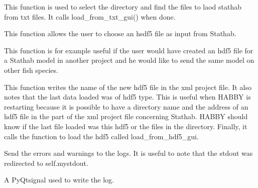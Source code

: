\documentclass[letterpaper,10pt,english]{sphinxmanual}
\begin{document}
\begin{fulllineitems}

\begin{fulllineitems}
\label{\detokenize{index:src_GUI.stathab_GUI.StathabW.select_dir}}
This function is used to select the directory and find the files to laod stathab from txt files. It calls
load\_from\_txt\_gui() when done.

\end{fulllineitems}


\begin{fulllineitems}
\label{\detokenize{index:src_GUI.stathab_GUI.StathabW.select_hdf5}}
This function allows the user to choose an hsdf5 file as input from Stathab.


This function is for example useful if the user would have created an hdf5 file for a Stathab model in another
project and he would like to send the same model on other fish species.

This function writes the name of the new hdf5 file in the xml project file. It also notes that the last data
loaded was of hdf5 type. This is useful when HABBY is restarting because it is possible to have a
directory name and the address of an hdf5 file in the part of the xml project file concerning Stathab.
HABBY should know if the last file loaded was this hdf5 or the files in the directory.
Finally, it calls the function to load the hdf5 called load\_from\_hdf5\_gui.

\end{fulllineitems}


\begin{fulllineitems}
\label{\detokenize{index:src_GUI.stathab_GUI.StathabW.send_err_log}}
Send the errors and warnings to the logs. It is useful to note that the stdout was redirected to self.mystdout.

\end{fulllineitems}


\begin{fulllineitems}
\label{\detokenize{index:src_GUI.stathab_GUI.StathabW.send_log}}
A PyQtsignal used to write the log.


\end{fulllineitems}
\end{fulllineitems}
\end{document}
